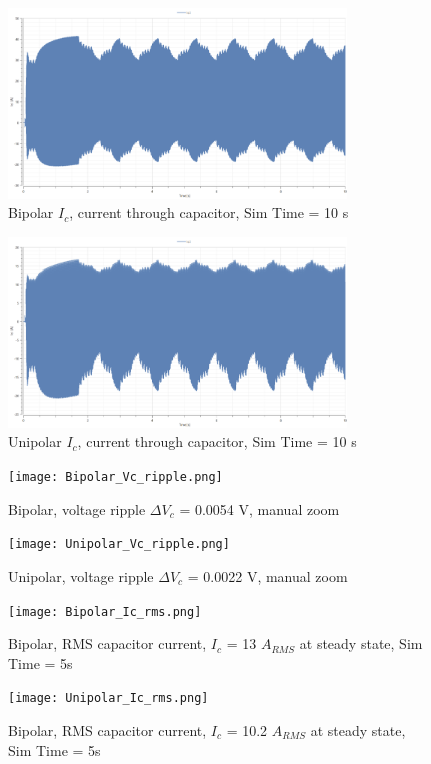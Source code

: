 \documentclass[12pt,twoside]{scrartcl}
\begin{document}
\begin{figure}[htp]
    \centering
    \includegraphics[width=0.8\textwidth]{Bipolar_Ic_10.png}
    \caption{Bipolar $I_c$, current through capacitor, Sim Time = 10 s}
    \label{fig:BipolarIc10}
\end{figure}
\begin{figure}[htp]
    \centering
    \includegraphics[width=0.8\textwidth]{Unipolar_Ic_10.png}
    \caption{Unipolar $I_c$, current through capacitor, Sim Time = 10 s}
    \label{fig:UnipolarIc10}
\end{figure}
\begin{figure}[htp]
    \centering
    \texttt{[image: Bipolar\_Vc\_ripple.png]}
    \caption{Bipolar, voltage ripple $\Delta V_c$ = 0.0054 V, manual zoom}
    \label{fig:BipolarVcripple}
\end{figure}
\begin{figure}[htp]
    \centering
    \texttt{[image: Unipolar\_Vc\_ripple.png]}
    \caption{Unipolar, voltage ripple $\Delta V_c$ = 0.0022 V, manual zoom}
    \label{fig:UnipolarVcripple}
\end{figure}
\begin{figure}[htp]
    \centering
    \texttt{[image: Bipolar\_Ic\_rms.png]}
    \caption{Bipolar, RMS capacitor current, $I_c$ = 13 $A_{RMS}$ at steady state, Sim Time = 5s}
    \label{fig:BipolarIcRMS}
\end{figure}
\begin{figure}[htp]
    \centering
    \texttt{[image: Unipolar\_Ic\_rms.png]}
    \caption{Bipolar, RMS capacitor current, $I_c$ = 10.2 $A_{RMS}$ at steady state, Sim Time = 5s}
    \label{fig:UnipolarIcRMS}
\end{figure}
\newpage
\end{document}
